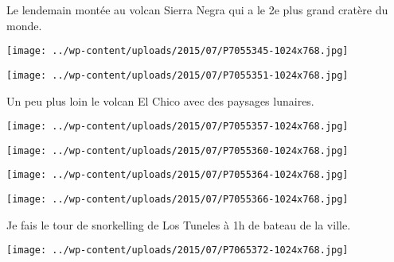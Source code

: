  

 Le lendemain montée au volcan Sierra Negra qui a le 2e plus grand cratère du monde. 

 

\begin{center} \texttt{[image: ../wp-content/uploads/2015/07/P7055345-1024x768.jpg]} \end{center}

 

 

\begin{center} \texttt{[image: ../wp-content/uploads/2015/07/P7055351-1024x768.jpg]} \end{center}

 

 Un peu plus loin le volcan El Chico avec des paysages lunaires. 

 

\begin{center} \texttt{[image: ../wp-content/uploads/2015/07/P7055357-1024x768.jpg]} \end{center}

 

 

\begin{center} \texttt{[image: ../wp-content/uploads/2015/07/P7055360-1024x768.jpg]} \end{center}

 

 

\begin{center} \texttt{[image: ../wp-content/uploads/2015/07/P7055364-1024x768.jpg]} \end{center}

 

 

\begin{center} \texttt{[image: ../wp-content/uploads/2015/07/P7055366-1024x768.jpg]} \end{center}

 

 Je fais le tour de snorkelling de Los Tuneles à 1h de bateau de la ville. 

 

\begin{center} \texttt{[image: ../wp-content/uploads/2015/07/P7065372-1024x768.jpg]} \end{center}

 

